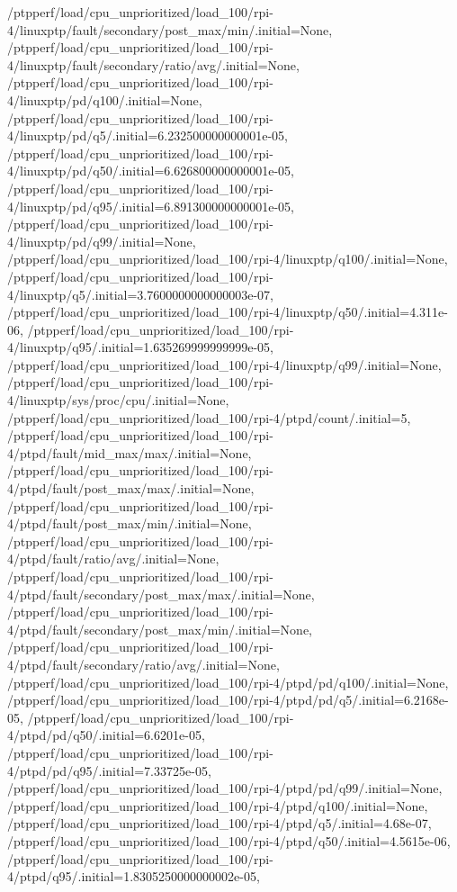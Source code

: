 {    /ptpperf/load/cpu_unprioritized/load_100/rpi-4/linuxptp/fault/secondary/post_max/min/.initial=None,
    /ptpperf/load/cpu_unprioritized/load_100/rpi-4/linuxptp/fault/secondary/ratio/avg/.initial=None,
    /ptpperf/load/cpu_unprioritized/load_100/rpi-4/linuxptp/pd/q100/.initial=None,
    /ptpperf/load/cpu_unprioritized/load_100/rpi-4/linuxptp/pd/q5/.initial=6.232500000000001e-05,
    /ptpperf/load/cpu_unprioritized/load_100/rpi-4/linuxptp/pd/q50/.initial=6.626800000000001e-05,
    /ptpperf/load/cpu_unprioritized/load_100/rpi-4/linuxptp/pd/q95/.initial=6.891300000000001e-05,
    /ptpperf/load/cpu_unprioritized/load_100/rpi-4/linuxptp/pd/q99/.initial=None,
    /ptpperf/load/cpu_unprioritized/load_100/rpi-4/linuxptp/q100/.initial=None,
    /ptpperf/load/cpu_unprioritized/load_100/rpi-4/linuxptp/q5/.initial=3.7600000000000003e-07,
    /ptpperf/load/cpu_unprioritized/load_100/rpi-4/linuxptp/q50/.initial=4.311e-06,
    /ptpperf/load/cpu_unprioritized/load_100/rpi-4/linuxptp/q95/.initial=1.635269999999999e-05,
    /ptpperf/load/cpu_unprioritized/load_100/rpi-4/linuxptp/q99/.initial=None,
    /ptpperf/load/cpu_unprioritized/load_100/rpi-4/linuxptp/sys/proc/cpu/.initial=None,
    /ptpperf/load/cpu_unprioritized/load_100/rpi-4/ptpd/count/.initial=5,
    /ptpperf/load/cpu_unprioritized/load_100/rpi-4/ptpd/fault/mid_max/max/.initial=None,
    /ptpperf/load/cpu_unprioritized/load_100/rpi-4/ptpd/fault/post_max/max/.initial=None,
    /ptpperf/load/cpu_unprioritized/load_100/rpi-4/ptpd/fault/post_max/min/.initial=None,
    /ptpperf/load/cpu_unprioritized/load_100/rpi-4/ptpd/fault/ratio/avg/.initial=None,
    /ptpperf/load/cpu_unprioritized/load_100/rpi-4/ptpd/fault/secondary/post_max/max/.initial=None,
    /ptpperf/load/cpu_unprioritized/load_100/rpi-4/ptpd/fault/secondary/post_max/min/.initial=None,
    /ptpperf/load/cpu_unprioritized/load_100/rpi-4/ptpd/fault/secondary/ratio/avg/.initial=None,
    /ptpperf/load/cpu_unprioritized/load_100/rpi-4/ptpd/pd/q100/.initial=None,
    /ptpperf/load/cpu_unprioritized/load_100/rpi-4/ptpd/pd/q5/.initial=6.2168e-05,
    /ptpperf/load/cpu_unprioritized/load_100/rpi-4/ptpd/pd/q50/.initial=6.6201e-05,
    /ptpperf/load/cpu_unprioritized/load_100/rpi-4/ptpd/pd/q95/.initial=7.33725e-05,
    /ptpperf/load/cpu_unprioritized/load_100/rpi-4/ptpd/pd/q99/.initial=None,
    /ptpperf/load/cpu_unprioritized/load_100/rpi-4/ptpd/q100/.initial=None,
    /ptpperf/load/cpu_unprioritized/load_100/rpi-4/ptpd/q5/.initial=4.68e-07,
    /ptpperf/load/cpu_unprioritized/load_100/rpi-4/ptpd/q50/.initial=4.5615e-06,
    /ptpperf/load/cpu_unprioritized/load_100/rpi-4/ptpd/q95/.initial=1.8305250000000002e-05,
}
